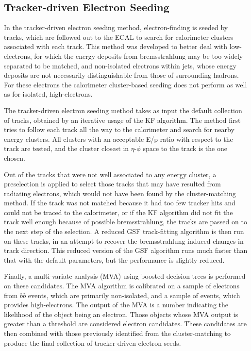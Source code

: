 \subsection{Tracker-driven Electron Seeding}
\label{evReco:trkDrv}
In the tracker-driven electron seeding method, 
electron-finding is seeded by tracks, 
which are followed out to the 
ECAL to search for calorimeter clusters 
associated with each track.  
This method was developed to better deal with 
low-\pT electrons, for which the energy deposits 
from bremsstrahlung may be too widely separated 
to be matched,  
and non-isolated electrons within jets, 
whose energy deposits are not necessarily 
distinguishable from those of surrounding hadrons.  
For these electrons the calorimeter cluster-based 
seeding does not perform as well as for 
isolated, high-\pT electrons.  

The tracker-driven electron seeding method 
takes as input the default collection 
of tracks, obtained by an iterative usage 
of the KF algorithm.  
The method first tries to follow each track 
all the way to the calorimeter and search 
for nearby energy clusters.  
All clusters with an acceptable E/p ratio 
with respect to the track are tested, 
and the cluster closest in $\eta$-$\phi$ 
space to the track is the one chosen. 
 
Out of the tracks that were not 
well associated to any energy cluster, 
a preselection is applied to select 
those tracks that may have resulted from 
radiating electrons, 
which would not have been found 
by the cluster-matching method.  
If the track was not matched because it had 
too few tracker hits and could not be traced 
to the calorimeter, 
or if the KF algorithm did not fit the 
track well enough because of possible 
bremsstrahlung, the tracks are passed 
on to the next step of the selection.  
A reduced GSF track-fitting algorithm 
is then run on these tracks, 
in an attempt to recover the 
bremsstrahlung-induced changes in track direction. 
This reduced version of the GSF algorithm runs 
much faster than that with the default parameters, 
but the performance is slightly reduced.  

Finally, a multi-variate analysis (MVA) using 
boosted decision trees 
is performed on these candidates.  
The MVA algorithm is 
calibrated 
on a sample of electrons from 
$b \bar{b}$ events, which are primarily non-isolated, 
and a sample of \Zee events, 
which provides high-\pT electrons.  
The output of the MVA is a number indicating 
the likelihood of the object being an electron.   
Those objects whose MVA output is greater than a threshold 
are considered electron candidates. 
These candidates are then combined with those 
previously identified from the cluster-matching 
to produce the final collection of 
tracker-driven electron seeds.  

